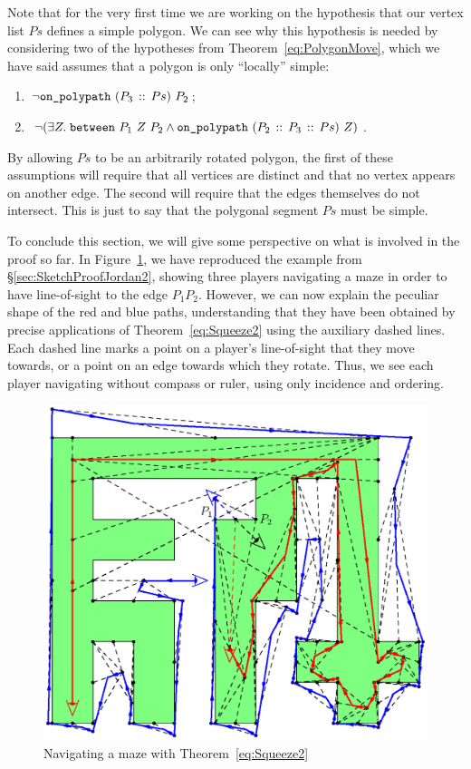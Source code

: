 Note that for the very first time we are working on the hypothesis that our vertex list $Ps$ defines a simple polygon. We can see why this hypothesis is needed by considering two of the hypotheses from Theorem~\ref{eq:PolygonMove}, which we have said assumes that a polygon is only ``locally'' simple:
\begin{enumerate}
\item $\neg\code{on\_polypath}\ (\cons{P_3}{Ps})\ P_2$;
\item $\neg(\exists Z.\; \between{P_1}{Z}{P_2} \wedge \code{on\_polypath}\ (\cons{P_2}{\cons{P_3}{Ps}})\ Z)$.
\end{enumerate}

By allowing $Ps$ to be an arbitrarily rotated polygon, the first of these assumptions will require that all vertices are distinct and that no vertex appears on another edge. The second will require that the edges themselves do not intersect. This is just to say that the polygonal segment $Ps$ must be simple.

To conclude this section, we will give some perspective on what is involved in the proof so far. In Figure~\ref{fig:SketchProofJordan2Full}, we have reproduced the example from \S\ref{sec:SketchProofJordan2}, showing three players navigating a maze in order to have line-of-sight to the edge $P_1P_2$. However, we can now explain the peculiar shape of the red and blue paths, understanding that they have been obtained by precise applications of Theorem~\ref{eq:Squeeze2} using the auxiliary dashed lines. Each dashed line marks a point on a player's line-of-sight that they move towards, or a point on an edge towards which they rotate. Thus, we see each player navigating without compass or ruler, using only incidence and ordering.

\begin{figure}
  \centering\includegraphics[scale=0.9]{jordanVerification2/SketchProofFull}
  \caption{Navigating a maze with Theorem~\ref{eq:Squeeze2}}
  \label{fig:SketchProofJordan2Full}
\end{figure}

